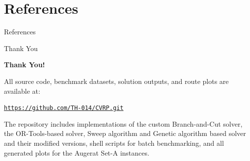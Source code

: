 \documentclass{beamer}
\begin{document}
\section{References}

\begin{frame}[allowframebreaks]{References}
    \printbibliography[heading=none]
\end{frame}

\begin{frame}[c]{Thank You}

\begin{center}

\Large\textbf{Thank You!}

\vspace{1.2em}

\normalsize
All source code, benchmark datasets, solution outputs, and route plots
are available at:

\vspace{0.8em}

\large
\texttt{\href{https://github.com/TH-014/CVRP.git}{https://github.com/TH-014/CVRP.git}}

\vspace{1.5em}

\normalsize
\begin{block}{}
\centering
The repository includes implementations of the custom Branch-and-Cut
solver, the OR-Tools-based solver, Sweep algorithm and Genetic algorithm based solver and their modified versions, shell scripts for batch benchmarking, and all generated plots for the Augerat Set-A instances.
\end{block}

\end{center}

\end{frame}
\end{document}
